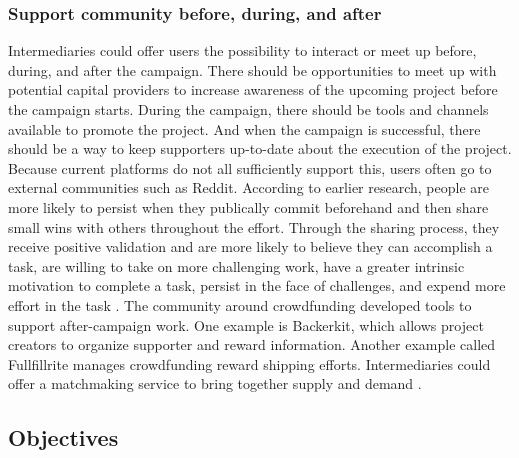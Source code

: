 \subsubsection*{Support community before, during, and after}
Intermediaries could offer users the possibility to interact or meet up before, during, and after the campaign.
There should be opportunities to meet up with potential capital providers to increase awareness of the upcoming project before the campaign starts. During the campaign, there should be tools and channels available to promote the project. And when the campaign is successful, there should be a way to keep supporters
up-to-date about the execution of the project. Because current platforms do not all sufficiently support this,
users often go to external communities such as Reddit.
According to earlier research, people are more likely to persist when they publically commit beforehand
and then share small wins with others throughout the effort. Through the sharing process, they receive positive validation and are more likely to believe they can accomplish a task, are willing to take on more challenging work, have a greater intrinsic motivation to complete a task, persist in the face of challenges, and expend
more effort in the task \cite{crowdMotiv}.
The community around crowdfunding developed tools to support after-campaign work. One example
is Backerkit, which allows project creators to organize supporter and reward information. Another example
called Fullfillrite manages crowdfunding reward shipping efforts. Intermediaries could offer a matchmaking
service to bring together supply and demand \cite{doi:10.5465/ambpp.2014.209}.

\subsection{Objectives}


